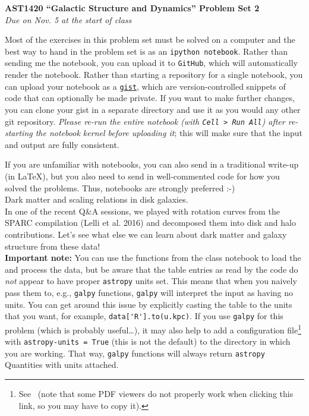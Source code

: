 \documentclass[12pt]{article}
\begin{document}
\begin{center}
{\bf \LARGE AST1420 ``Galactic Structure and Dynamics'' Problem Set 2}\\[7pt]
\emph{Due on Nov. 5 at the start of class}\\[7pt]
\end{center}

Most of the exercises in this problem set must be solved on a computer
and the best way to hand in the problem set is as an \texttt{ipython
  notebook}. Rather than sending me the notebook, you can upload it to
\texttt{GitHub}, which will automatically render the notebook. Rather
than starting a repository for a single notebook, you can upload your
notebook as a \texttt{\href{https://gist.github.com/}{gist}}, which
are version-controlled snippets of code that can optionally be made
private. If you want to make further changes, you can clone your gist
in a separate directory and use it as you would any other git
repository. \emph{Please re-run the entire notebook (with \texttt{Cell
    > Run All}) after re-starting the notebook kernel before uploading
  it}; this will make sure that the input and output are fully
consistent.

If you are unfamiliar with notebooks, you can also send in a
traditional write-up (in LaTeX), but you also need to send in
well-commented code for how you solved the problems. Thus, notebooks
are strongly preferred :-)\\

 Dark matter and scaling relations in disk
galaxies.\\

In one of the recent Q\&A sessions, we played with rotation curves
from the SPARC compilation (Lelli et al. 2016) and decomposed them
into disk and halo contributions. Let's see what else we can learn
about dark matter and galaxy structure from these data!\\

{\bf Important note:} You can use the functions from the class
notebook to load the and process the data, but be aware that the table
entries as read by the code do \emph{not} appear to have proper
\texttt{astropy} units set. This means that when you naively pass them
to, e.g., \texttt{galpy} functions, \texttt{galpy} will interpret the
input as having no units. You can get around this issue by explicitly
casting the table to the units that you want, for example,
\verb!data['R'].to(u.kpc)!. If you use \texttt{galpy} for this problem
(which is probably useful\ldots), it may also help to add a
configuration file\footnote{See \galpyconfig\ (note that some PDF
  viewers do not properly work when clicking this link, so you may
  have to copy it).} with \texttt{astropy-units = True} (this is not
the default) to the directory in which you are working. That way,
\texttt{galpy} functions will always return \texttt{astropy}
Quantities with units attached.\\
\end{document}
